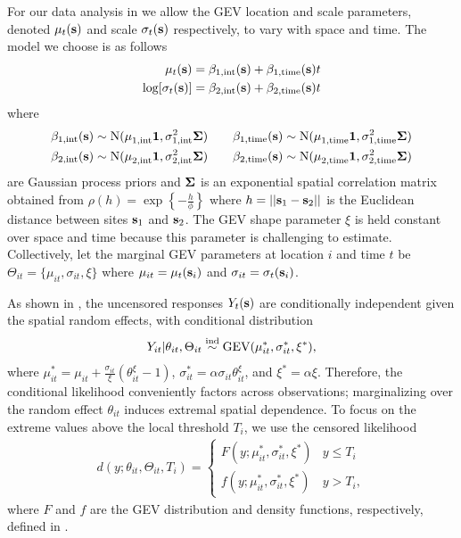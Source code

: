 \documentclass[aoas]{imsart}
\begin{document}
For our data analysis in  we allow the GEV location and scale parameters, denoted $\mu_t(\mathbf{s})$ and scale $\sigma_t(\mathbf{s})$ respectively, to vary with space and time.
The model we choose is as follows
\begin{align}\label{ebeq:GPprior}
  \mu_t(\bs) &= \beta_{1, \text{int}}(\bs) + \beta_{1, \text{time}}(\bs) t\\
  \log[\sigma_t(\bs)] &= \beta_{2, \text{int}}(\bs) + \beta_{2, \text{time}}(\bs) t
\end{align}
where
\begin{align} \label{ebeq:GPhyper}
  \beta_{1, \text{int}}(\bs) &\sim \text{N}(\mu^{\phantom{2}}_{1, \text{int}} \bOne, \sigma^2_{1, \text{int}} \bSigma) \quad &\beta_{1, \text{time}}(\bs) &\sim \text{N}(\mu^{\phantom{2}}_{1, \text{time}} \bOne, \sigma^2_{1, \text{time}} \bSigma) \\
  \beta_{2, \text{int}}(\bs) &\sim \text{N}(\mu^{\phantom{2}}_{2, \text{int}} \bOne, \sigma^2_{2, \text{int}} \bSigma) \quad &\beta_{2, \text{time}}(\bs) &\sim \text{N}(\mu^{\phantom{2}}_{2, \text{time}} \bOne, \sigma^2_{2, \text{time}} \bSigma) \nonumber
\end{align}
are Gaussian process priors and $\mbox{\boldmath $\Sigma$}$ is an exponential spatial correlation matrix obtained from \mbox{$\rho(h) = \exp\left\{- \frac{h}{\phi}\right\}$} where $h = ||\mathbf{s}_1 - \mathbf{s}_2||$ is the Euclidean distance between sites $\mathbf{s}_1$ and $\mathbf{s}_2$.
The GEV shape parameter $\xi$ is held constant over space and time because this parameter is challenging to estimate.
Collectively, let the marginal GEV parameters at location $i$ and time $t$ be $\Theta_{it} = \{\mu_{it},\sigma_{it},\xi\}$ where $\mu_{it} = \mu_t(\mathbf{s}_i)$ and $\sigma_{it} = \sigma_t(\mathbf{s}_i)$.

As shown in \citet{Reich2012}, the uncensored responses $Y_{t}(\mathbf{s})$ are conditionally independent given the spatial random effects, with conditional distribution
\begin{align} \label{ebeq:Ycond}
   Y_{it}|\theta_{it},\Theta_{it} \ind \mathrm{GEV}(\mu^*_{it}, \sigma_{it}^*,\xi^*),
\end{align}
where $\mu_{it}^* = \mu_{it} + \frac{\sigma_{it}}{\xi}(\theta_{it}^\xi - 1)$,
$\sigma_{it}^* = \alpha\sigma_{it}\theta_{it}^\xi$, and $\xi^* = \alpha\xi$.
Therefore, the conditional likelihood conveniently factors across observations; marginalizing over the random effect $\theta_{it}$ induces extremal spatial dependence.
To focus on the extreme values above the local threshold $T_i$, we use the censored likelihood
\begin{align} \label{ebeq:g}
d(y;\theta_{it},\Theta_{it}, T_i)  = \begin{cases}
  F(y;\mu_{it}^*,\sigma_{it}^*,\xi^*) & y \le T_i \\
  f(y;\mu_{it}^*,\sigma_{it}^*,\xi^*) & y>T_i,
\end{cases}
\end{align}
where $F$ and $f$ are the GEV distribution and density functions, respectively, defined in .
\end{document}
